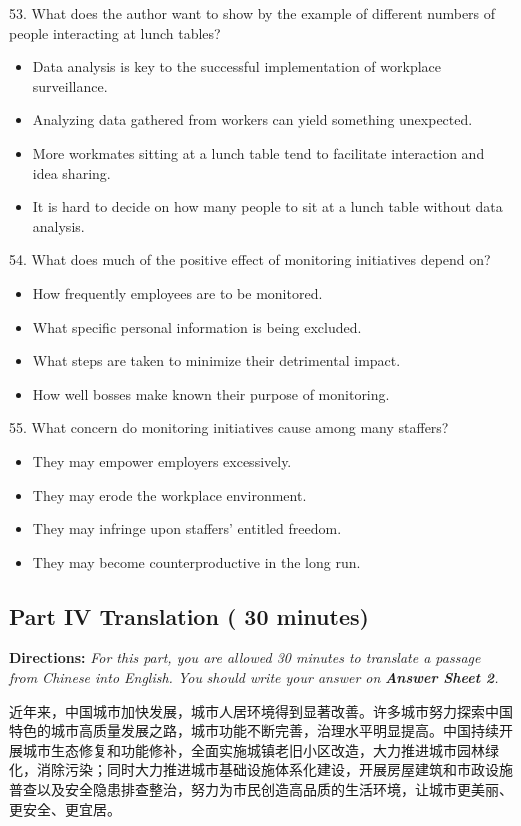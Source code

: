 \documentclass[UTF8,11pt]{ctexart}
\begin{document}
53. What does the author want to show by the example of different numbers of people interacting at lunch tables?


\begin{itemize}[leftmargin=2em,itemsep=.2em,topsep=.4em]\item[A.] Data analysis is key to the successful implementation of workplace surveillance.
\item[B.] Analyzing data gathered from workers can yield something unexpected.
\item[C.] More workmates sitting at a lunch table tend to facilitate interaction and idea sharing.
\item[D.] It is hard to decide on how many people to sit at a lunch table without data analysis.
\end{itemize}

54. What does much of the positive effect of monitoring initiatives depend on?


\begin{itemize}[leftmargin=2em,itemsep=.2em,topsep=.4em]\item[A.] How frequently employees are to be monitored.
\item[B.] What specific personal information is being excluded.
\item[C.] What steps are taken to minimize their detrimental impact.
\item[D.] How well bosses make known their purpose of monitoring.
\end{itemize}

55. What concern do monitoring initiatives cause among many staffers?


\begin{itemize}[leftmargin=2em,itemsep=.2em,topsep=.4em]\item[A.] They may empower employers excessively.
\item[B.] They may erode the workplace environment.
\item[C.] They may infringe upon staffers’ entitled freedom.
\item[D.] They may become counterproductive in the long run.
\end{itemize}

\subsection*{\textbf{Part IV Translation} \textbf{( 30 minutes)}}


\textbf{Directions: }\textit{For this part, you are allowed 30 minutes to translate a passage from Chinese into English. You} \textit{should write your answer on }\textbf{\textit{Answer Sheet 2}}\textit{.}


近年来，中国城市加快发展，城市人居环境得到显著改善。许多城市努力探索中国特色的城市高质量发展之路，城市功能不断完善，治理水平明显提高。中国持续开展城市生态修复和功能修补，全面实施城镇老旧小区改造，大力推进城市园林绿化，消除污染；同时大力推进城市基础设施体系化建设，开展房屋建筑和市政设施普查以及安全隐患排查整治，努力为市民创造高品质的生活环境，让城市更美丽、更安全、更宜居。
\end{document}
